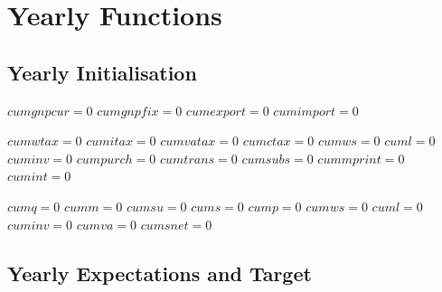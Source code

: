 \documentclass{article}
\begin{document}
\section{Yearly Functions}

\subsection{Yearly Initialisation}

\begin{algorithm}[H]
\caption{Yearly Init}
    \begin{algorithmic}
        \State $cumgnpcur = 0$
        \State $cumgnpfix = 0$
        \State $cumexport = 0$
        \State $cumimport = 0$
        \\
        \State {}
        \State {}
        \EndFor
        \EndFunction
    \end{algorithmic}
\end{algorithm}

\begin{algorithm}[!htbp]
\caption{Yearly Init (Government)}
    \begin{algorithmic}
        \State $cumwtax = 0$
    	\State $cumitax = 0$
    	\State $cumvatax = 0$
    	\State $cumctax = 0$
    	\State $cumws = 0$
    	\State $cuml = 0$
    	\State $cuminv = 0$
    	\State $cumpurch = 0$
    	\State $cumtrans = 0$
    	\State $cumsubs = 0$
    	\State $cummprint = 0$
    	\State $cumint = 0$
        \EndFunction
    \end{algorithmic}
\end{algorithm}

\begin{algorithm}[!htbp]
\caption{Yearly Init (Firm)}
    \begin{algorithmic}
        \State $cumq = 0$
        \State $cumm = 0$
        \State $cumsu = 0$
        \State $cums = 0$
        \State $cump = 0$
        \State $cumws = 0$
        \State $cuml = 0$
        \State $cuminv = 0$
        \State $cumva = 0$
        \State $cumsnet = 0$
        \EndFunction
    \end{algorithmic}
\end{algorithm}

\clearpage
\subsection{Yearly Expectations and Target}
\end{document}
